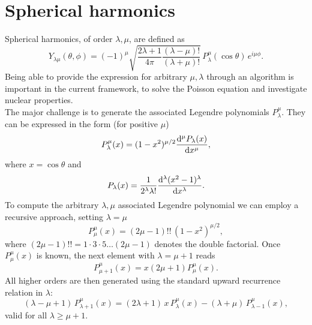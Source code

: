 \section{Spherical harmonics}
\label{sec:spherical_harmonics}
Spherical harmonics, of order $\lambda, \mu$, are defined as
\begin{equation}
    Y_{\lambda\mu} (\theta, \phi) = (-1)^\mu 
    \sqrt{\frac{2\lambda + 1}{4\pi}\frac{(\lambda-\mu)!}{(\lambda+\mu)!}}
    \, P_\lambda^\mu(\cos\theta) \, e^{i\mu\phi}.
\end{equation}
Being able to provide the expression for arbitrary $\mu, \lambda$ through an algorithm 
is important in the current framework, to solve the Poisson equation and investigate 
nuclear properties.
\\The major challenge is to generate the associated Legendre polynomials $P_\lambda^\mu$.
They can be expressed in the form (for positive $\mu$)
\begin{equation}
    P_\lambda^\mu(x) = (1-x^2)^{\mu/2} \dv[\mu]{P_\lambda(x)}{x},
\end{equation}
where $x = \cos\theta$ and
\begin{equation}
    P_\lambda(x) = \frac 1 {2^\lambda \lambda !}
    \dv[\lambda]{(x^2-1)^\lambda}{x}.
\end{equation}
To compute the arbitrary $\lambda, \mu$ associated Legendre polynomial we can employ a recursive approach, setting $\lambda =\mu$
\begin{equation}
    P_\mu^\mu(x) = (2\mu-1)!! \, (1-x^2)^{\mu/2},
\end{equation}
where $(2\mu-1)!! = 1\cdot 3 \cdot 5 \ldots (2\mu-1)$ denotes the double factorial.
Once $P_\mu^\mu(x)$ is known, the next element with $\lambda = \mu +1$ reads
\begin{equation}
    P_{\mu+1}^\mu(x) = x(2\mu+1)P_\mu^\mu(x).
\end{equation}
All higher orders are then generated using the standard upward recurrence relation in $\lambda$:
\begin{equation}
    (\lambda - \mu + 1) \, P_{\lambda+1}^\mu(x) =
    (2\lambda + 1) \, x \, P_\lambda^\mu(x) -
    (\lambda + \mu) \, P_{\lambda-1}^\mu(x),
\end{equation}
valid for all $\lambda \geq \mu+1$.  
